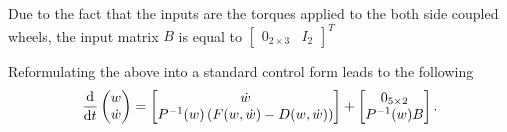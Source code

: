 Due to the fact that the inputs are the torques applied to the both side coupled wheels,
the input matrix $B$ is equal to $\begin{bmatrix}
0_{2 \times 3} & I_2
\end{bmatrix}^T$ 

Reformulating the above into a standard control form leads to the following
\begin{equation}
\frac{\mathrm{d}}{\mathrm{d} t}\begin{pmatrix}
w \\ \dot w
\end{pmatrix}
 = 
 \begin{bmatrix}
 \dot w \\ P^{-1}(w)\left( F(w, \dot w) - D(w, \dot w) \right)
 \end{bmatrix}+\begin{bmatrix}
 0_{5\times 2} \\ P^{-1}(w)B
 \end{bmatrix}.
\end{equation}
